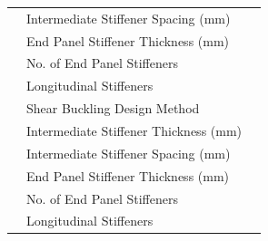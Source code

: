 \documentclass[12pt,a4paper]{report}
\numberwithin{figure}{chapter}
\begin{document}
\begin{longtable}{|C{3.81cm}|L{6.8cm}|C{3.51cm}|}
 & Intermediate Stiffener Spacing (mm) &  \\*
 & End Panel Stiffener Thickness (mm) &  \\*
 & No. of End Panel Stiffeners &  \\*
 & Longitudinal Stiffeners &  \\
\hline
{}
 & Shear Buckling Design Method &  \\*
 & Intermediate Stiffener Thickness (mm) &  \\*
 & Intermediate Stiffener Spacing (mm) &  \\*
 & End Panel Stiffener Thickness (mm) &  \\*
 & No. of End Panel Stiffeners &  \\*
 & Longitudinal Stiffeners &  \\
\hline
\end{longtable}

\vspace{1em}
\end{document}
